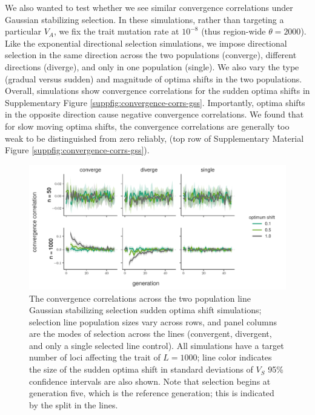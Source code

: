 \documentclass[11pt]{article}
\begin{document}
{We also wanted to test whether we see similar convergence correlations under
Gaussian stabilizing selection. In these simulations, rather than targeting a
particular $V_A$, we fix the trait mutation rate at $10^{-8}$ (thus region-wide
$\theta = 2000$). Like the exponential directional selection simulations, we
impose directional selection in the same direction across the two populations
(converge), different directions (diverge), and only in one population
(single). We also vary the type (gradual versus sudden) and magnitude of optima
shifts in the two populations. Overall, simulations show convergence
correlations for the sudden optima shifts in Supplementary Figure
\ref{suppfig:convergence-corrs-gss}. Importantly, optima shifts in the opposite
direction cause negative convergence correlations. We found that for slow
moving optima shifts, the convergence correlations are generally too weak to be
distinguished from zero reliably, (top row of Supplementary Material Figure
\ref{suppfig:convergence-corrs-gss}).

\begin{figure}[!ht]
  \centering
  \includegraphics[width=\textwidth]{figures/fig-convergence-corrs-gss.pdf}

  \caption{The convergence correlations across the two population line Gaussian
    stabilizing selection sudden optima shift simulations; selection line
    population sizes vary across rows, and panel columns are the modes of
    selection across the lines (convergent, divergent, and only a single
    selected line control). All simulations have a target number of loci
    affecting the trait of $L = 1000$; line color indicates the size of the
    sudden optima shift in standard deviations of $V_S$ 95\% confidence
  intervals are also shown. Note that selection begins at generation five,
which is the reference generation; this is indicated by the split in the
lines.}


\end{figure}}
\end{document}
